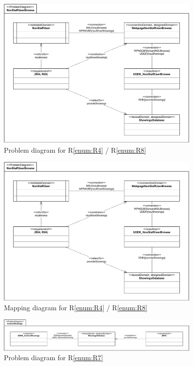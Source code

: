 \documentclass[a4paper,10pt,titlepage,bibtotoc,bibtotocnumbered]{scrreprt}
\begin{document}
\begin{figure}[H]
\centering
\includegraphics[width=0.9\textwidth]{figures/04/a04_problem_diagram_2-PD.pdf}
\caption{Problem diagram for R\ref{enum:R4} / R\ref{enum:R8}}
\label{figure:pdR48}
\end{figure}

\begin{figure}[H]
\centering
\includegraphics[width=0.9\textwidth]{figures/04/a04_problem_diagram_2-Mapping.pdf}
\caption{Mapping diagram for R\ref{enum:R4} / R\ref{enum:R8}}
\label{figure:mdR48}
\end{figure}

\begin{figure}[H]
\centering
\includegraphics[width=0.9\textwidth]{figures/04/a04_problem_diagram_4-PD.pdf}
\caption{Problem diagram for R\ref{enum:R7}}
\label{figure:pdR7}
\end{figure}
\end{document}
